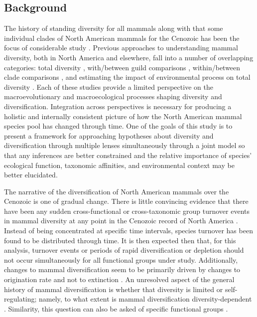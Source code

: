 \documentclass[12pt,letterpaper]{article}
\begin{document}
\subsection*{Background}

The history of standing diversity for all mammals along with that some individual clades of North American mammals for the Cenozoic has been the focus of considerable study \citep{Alroy2009,Alroy1996a,Janis1993b,Alroy2000g,Figueirido2012,Pires2015a,Fraser2015a,Smits2015b,Quental2013,Slater2015c,Silvestro2015b,Badgley2013,Blois2009,Janis1993c}. Previous approaches to understanding mammal diversity, both in North America and elsewhere, fall into a number of overlapping categories: total diversity \citep{Alroy2000g,Alroy1996a,Figueirido2012,Liow2008}, with/between guild comparisons \citep{Janis2004,Janis2000,Jernvall2004,Janis1993c,Pires2015a,Janis2008a}, within/between clade comparisons \citep{Quental2013,Slater2015c,Silvestro2015b,Fraser2015a,Cantalapiedra2017}, and estimating the impact of environmental process on total diversity \citep{Blois2009,Janis1993c,Janis1993b,Fraser2015a,Eronen2015,Badgley2013,Badgley2017,Alroy2000g}. Each of these studies provide a limited perspective on the macroevolutionary and macroecological processes shaping diversity and diversification. Integration across perspectives is necessary for producing a holistic and internally consistent picture of how the North American mammal species pool has changed through time. One of the goals of this study is to present a framework for approaching hypotheses about diversity and diversification through multiple lenses simultaneously through a joint model so that any inferences are better constrained and the relative importance of species' ecological function, taxonomic affinities, and environmental context may be better elucidated.

The narrative of the diversification of North American mammals over the Cenozoic is one of gradual change. There is little convincing evidence that there have been any sudden cross-functional or cross-taxonomic group turnover events in mammal diversity at any point in the Cenozoic record of North America \citep{Alroy2009,Alroy1996a,Eronen2015,Janis1993b,Alroy2000g}. Instead of being concentrated at specific time intervals, species turnover has been found to be distributed through time. It is then expected then that, for this analysis, turnover events or periods of rapid diversification or depletion should not occur simultaneously for all functional groups under study. Additionally, changes to mammal diversification seem to be primarily driven by changes to origination rate and not to extinction \citep{Alroy1996a,Alroy2000g,Alroy2009}. An unresolved aspect of the general history of mammal diversification is whether that diversity is limited or self-regulating; namely, to what extent is mammal diversification diversity-dependent \citep{Alroy2009,Rabosky2015b,Harmon2015a,Rabosky2013a}. Similarity, this question can also be asked of specific functional groups \citep{Jernvall2004,Valkenburgh1999,Silvestro2015b,Quental2013}.
\end{document}

